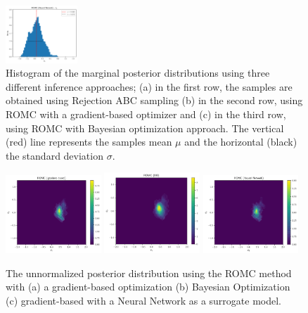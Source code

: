 \documentclass[article, shortnames]{jss}
\begin{document}
\begin{figure}[ht]
\begin{center}
    \includegraphics[width=0.24\textwidth]{./latex_files/images/chapter4/mae2_hist_t2_romc_nn.pdf}
    \end{center}
    \caption[MA2 example, evaluation of the marginal
    distributions.]{Histogram of the marginal posterior distributions
      using three different inference approaches; (a) in the first
      row, the samples are obtained using Rejection ABC sampling (b)
      in the second row, using ROMC with a gradient-based optimizer
      and (c) in the third row, using ROMC with Bayesian optimization
      approach. The vertical (red) line represents the samples mean
      \(\mu\) and the horizontal (black) the standard deviation
      \(\sigma\).}
  \label{fig:ma2_3}
\end{figure}

\begin{figure}[ht]
  \begin{center}
    \includegraphics[width=0.32\textwidth]{./latex_files/images/chapter4/mae2_romc_posterior.pdf}
    \includegraphics[width=0.32\textwidth]{./latex_files/images/chapter4/mae2_romc_posterior_bo.pdf}
    \includegraphics[width=0.32\textwidth]{./latex_files/images/chapter4/mae2_romc_posterior_nn.pdf}
    \end{center}
    \caption[MA2 example, posterior distribution.]{The unnormalized posterior distribution using the ROMC method with (a) a gradient-based optimization (b) Bayesian Optimization (c) gradient-based with a Neural Network as a surrogate model.}
  \label{fig:ma2_4}
\end{figure}
\end{document}
